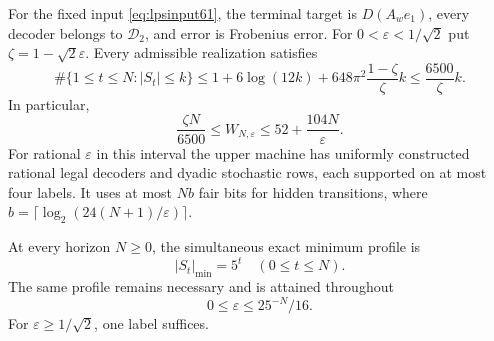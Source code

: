 \begin{theorem}
\label{thm:effectivelps61}
For the fixed input \eqref{eq:lpsinput61}, the terminal target is
$D(A_w e_1)$, every decoder belongs to $\mathcal D_2$, and error is
Frobenius error. For $0<\varepsilon<1/\sqrt2$ put
$\zeta=1-\sqrt2\varepsilon$. Every admissible realization satisfies
\begin{equation}\label{eq:lpsoccupation61}
 \#\{1\le t\le N:|S_t|\le k\}
 \le 1+6\log(12k)+648\pi^2\frac{1-\zeta}{\zeta}k
 \le\frac{6500}{\zeta}k.
\end{equation}
In particular,
\begin{equation}\label{eq:lpslinear61}
 \frac{\zeta N}{6500}\le W_{N,\varepsilon}
                       \le52+\frac{104N}{\varepsilon}.
\end{equation}
For rational $\varepsilon$ in this interval the upper machine has
uniformly constructed rational legal decoders and dyadic stochastic
rows, each supported on at most four labels. It uses at most $Nb$
fair bits for hidden transitions, where
$b=\lceil\log_2(24(N+1)/\varepsilon)\rceil$.

At every horizon $N\ge0$, the simultaneous exact minimum profile is
\begin{equation}\label{eq:lpsexact61}
                  |S_t|_{\min}=5^t\quad(0\le t\le N).
\end{equation}
The same profile remains necessary and is attained throughout
\begin{equation}\label{eq:lpsrobust61}
                         0\le\varepsilon\le25^{-N}/16.
\end{equation}
For $\varepsilon\ge1/\sqrt2$, one label suffices.
\end{theorem}
